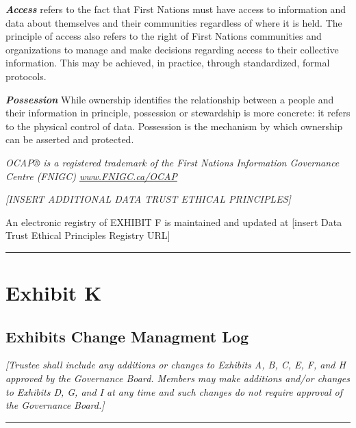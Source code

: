 \documentclass[]{book}
\begin{document}
\textbf{\emph{Access}} refers to the fact that First Nations must have access to information and data about themselves and their communities regardless of where it is held. The principle of access also refers to the right of First Nations communities and organizations to manage and make decisions regarding access to their collective information. This may be achieved, in practice, through standardized, formal protocols.

\textbf{\emph{Possession}} While ownership identifies the relationship between a people and their information in principle, possession or stewardship is more concrete: it refers to the physical control of data. Possession is the mechanism by which ownership can be asserted and protected.

\emph{OCAP® is a registered trademark of the First Nations Information Governance Centre (FNIGC) \href{https://fnigc.ca/www.fnigc.ca/OCAP}{www.FNIGC.ca/OCAP}}

\emph{{[}INSERT ADDITIONAL DATA TRUST ETHICAL PRINCIPLES{]}}

An electronic registry of EXHIBIT F is maintained and updated at {[}insert Data Trust Ethical Principles Registry URL{]}

\begin{center}\rule{0.5\linewidth}{0.5pt}\end{center}

\hypertarget{exhibit-k}{%
\chapter*{Exhibit K}\label{exhibit-k}}

\hypertarget{exhibits-change-managment-log}{%
\section*{Exhibits Change Managment Log}\label{exhibits-change-managment-log}}

\emph{{[}Trustee shall include any additions or changes to Exhibits A, B, C, E, F, and H approved by the Governance Board. Members may make additions and/or changes to Exhibits D, G, and I at any time and such changes do not require approval of the Governance Board.{]}}

\begin{center}\rule{0.5\linewidth}{0.5pt}\end{center}
\end{document}
